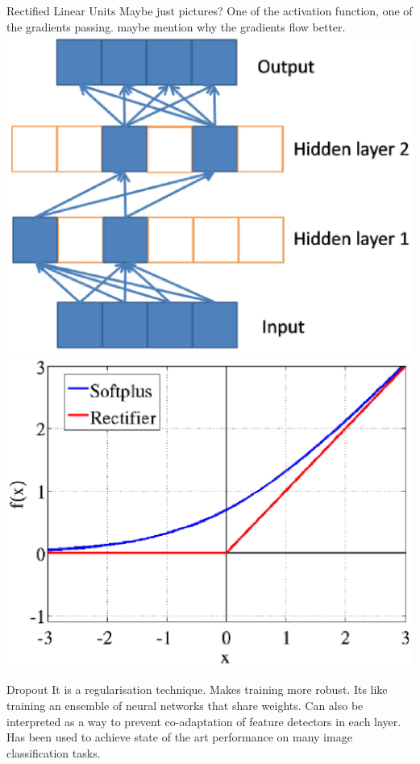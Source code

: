 \documentclass{beamer}
\begin{document}
\begin{frame}{Rectified Linear Units}
Maybe just pictures? One of the activation function, one of the gradients passing. maybe mention why the gradients flow better. 
\includegraphics[scale=0.3]{Figures/ReLU-grads.eps}
\includegraphics[scale=0.3]{Figures/ReLU-acts.eps}
\end{frame}

\begin{frame}{Dropout}
It is a regularisation technique. Makes training more robust. 
Its like training an ensemble of neural networks that share weights. Can also be interpreted as a way to prevent co-adaptation of feature detectors in each layer. 
Has been used to achieve state of the art performance on many image classification tasks. 

\end{frame}
\end{document}
